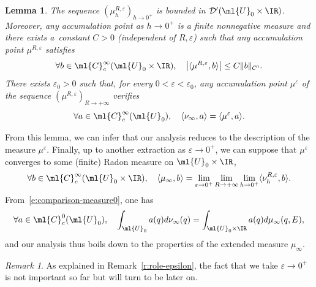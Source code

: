 \documentclass[10pt]{amsart}
\theoremstyle{plain}
\newtheorem{lemm}[theo]{Lemma}
\theoremstyle{definition}
\theoremstyle{remark}
\newtheorem{rema}[theo]{Remark}
\begin{document}
\begin{lemm}\label{l:mu_epsilon} The sequence $(\mu_{h}^{R,\varepsilon})_{h\to 0^+}$ is bounded in $\mathcal{D}^\prime(\ml{U}_0\times\IR)$. Moreover, any accumulation point as $h\to 0^+$ is a finite nonnegative measure and there exists a~constant $C>0$ (independent of $R,\varepsilon$) such that any accumulation point $\mu^{R,\varepsilon}$ satisfies
\[
\forall b\in\ml{C}_c^{\infty}(\ml{U}_0\times\IR),\quad \left|\langle\mu^{R,\varepsilon},b\rangle\right|\leq C \|b\|_{\mathcal{C}^0}.
\]
There exists $\varepsilon_0>0$ such that, for every $0<\varepsilon<\varepsilon_0$, any accumulation point $\mu^{\varepsilon}$ of the sequence $(\mu^{R,\varepsilon})_{R\to +\infty}$ verifies
\begin{equation}%
\forall a\in\ml{C}^{\infty}_c(\ml{U}_0),\quad\langle\nu_\infty,a\rangle=\langle\mu^{\varepsilon},a\rangle.\end{equation}
\end{lemm}

From this lemma, we can infer that our analysis reduces to the description of the measure $\mu^{\varepsilon}$. Finally, up to another extraction as $\varepsilon\to 0^+$, we can suppose that $\mu^{\varepsilon}$ converges to some (finite) Radon measure on $\ml{U}_0\times\IR$, \ie
\begin{equation}\label{e:full-wigner-H1}
\forall b\in\ml{C}_c^{\infty}(\ml{U}_0\times\IR),\quad \langle \mu_\infty,b\rangle=\lim_{\varepsilon\to 0^+}\lim_{R\to+\infty}\lim_{h\to 0^+}\langle\nu_h^{R,\varepsilon},b\rangle.
\end{equation}
From~\eqref{e:comparison-measure0}, one has
\begin{equation}%
\forall a\in\ml{C}^0_c(\ml{U}_0),\quad \int_{\ml{U}_0}a(q)d\nu_{\infty}(q)=\int_{\ml{U}_0\times\IR}a(q)d\mu_{\infty}(q,E),
\end{equation}
and our analysis thus boils down to the properties of the extended measure $\mu_\infty$.
\begin{rema}
As explained in Remark~\ref{r:role-epsilon}, the fact that we take $\varepsilon\to 0^+$ is not important so far but will turn to be later on.
\end{rema}
\end{document}
